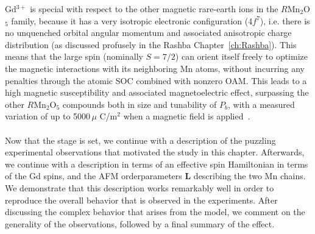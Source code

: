 Gd$^{3+}$ is special with respect to the other magnetic rare-earth ions in the $R$Mn$_2$O$_5$ family, because it has a very isotropic electronic configuration (4$f^7$), i.e. there is no unquenched orbital angular momentum and associated anisotropic charge distribution (as discussed profusely in the Rashba Chapter~\ref{ch:Rashba}). This means that the large spin (nominally $S=7/2$) can orient itself freely to optimize the magnetic interactions with its neighboring Mn atoms, without incurring any penalties through the atomic SOC combined with nonzero OAM.
This leads to a high magnetic susceptibility and associated magnetoelectric effect, surpassing the other $R$Mn$_2$O$_5$ compounds both in size and tunability of $P_b$, with a measured variation of up to 5000\,$\mu$ C/m$^2$ when a magnetic field is applied~\cite{Lee13}. 
\\\\
Now that the stage is set, we continue with a description of the puzzling experimental observations that motivated the study in this chapter.
Afterwards, we continue with a description in terms of an effective spin Hamiltonian in terms of the Gd spins, and the AFM orderparameters $\bm L$ describing the two Mn chains.
We demonstrate that this description works remarkably well in order to reproduce the overall behavior that is observed in the experiments.
After discussing the complex behavior that arises from the model, we comment on the generality of the observations, followed by a final summary of the effect. 

